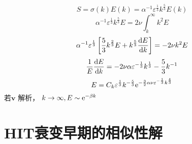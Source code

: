 \documentclass[12pt]{ctexart}
\begin{document}
\begin{equation}
   S = \sigma(k) E(k) = \alpha ^{-1} \varepsilon^{\frac{1}{3}} k^{\frac{5}{3}} E(k)
\end{equation}
\begin{equation}
   \alpha ^{-1} \varepsilon^{\frac{1}{3}} k^{\frac{5}{3}} E = 2\nu \int_{k}^{\infty} k^2 E 
\end{equation}
\begin{equation}
   \alpha ^{-1} \varepsilon^{\frac{1}{3}} \left[ \frac{5}{3} k^{\frac{2}{3}}E + k^{\frac{5}{3}} \frac{\dif E}{\dif k} \right] = - 2 \nu k^2 E
\end{equation}
\begin{equation}
   \frac{1}{E} \frac{\dif E}{\dif k} = -2 \nu \alpha \varepsilon^{-\frac{1}{3}} k^{\frac{1}{3}} - \frac{5}{3} k^{-1}
\end{equation}
\begin{equation}
   E = C_k \varepsilon^{\frac{1}{3}} k^{-\frac{5}{3}} \mathrm{e}^{-\frac{3}{2}\alpha \nu \varepsilon^{-\frac{1}{3}} k^{\frac{4}{3}}}
\end{equation}
若$\bm{v} $ 解析， $k\to \infty, E \sim \mathrm{e}^{-\beta k}$

\section{HIT衰变早期的相似性解}
\end{document}
